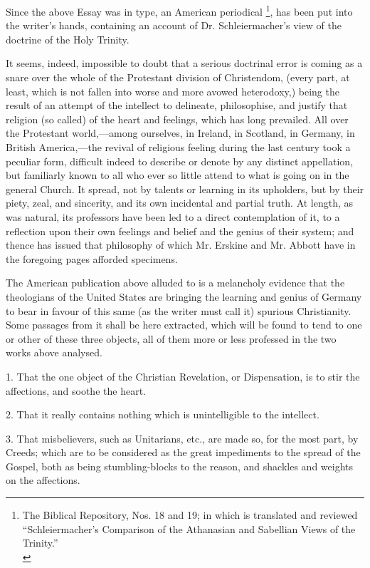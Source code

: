 Since the above Essay was in type, an American
periodical \footnote{The Biblical Repository, Nos. 18 and 19; in which is translated and
reviewed ``Schleiermacher's Comparison of the Athanasian and
Sabellian Views of the Trinity.''\textbf{}\\}, has been put
into the writer's hands, containing an account of Dr.
Schleiermacher's view of the doctrine of the Holy Trinity.

It seems, indeed, impossible to doubt that a
serious doctrinal error is coming as a snare over the whole of the
Protestant division of Christendom, (every part, at least, which is
not fallen into worse and more avowed heterodoxy,) being the result of
an attempt of the intellect to delineate, philosophise, and justify
that religion (so called) of the heart and feelings, which has long
prevailed. All over the Protestant world,—among ourselves, in
Ireland, in Scotland, in Germany, in British America,—the revival of
religious feeling during the last century took a peculiar form,
difficult indeed to describe or denote by any distinct appellation,
but familiarly known to all who ever so little attend to what is going
on in the general Church. It spread, not by talents or learning in its
upholders, but by their piety, zeal, and sincerity, and its own
incidental and partial truth. At length, as was natural, its
professors have been led to a direct contemplation of it, to a
reflection upon their own feelings and belief and the genius of their
system; and thence has issued that philosophy of which Mr.
Erskine and Mr. Abbott have in the foregoing pages afforded specimens.

The American publication above alluded to is a
melancholy evidence that the theologians of the United States are
bringing the learning and genius of Germany to bear in favour of this
same (as the writer must call it) spurious Christianity. Some passages
from it shall be here extracted, which will be found to tend to one or
other of these three objects, all of them more or less professed in
the two works above analysed.

1. That the one object of the Christian
Revelation, or Dispensation, is to stir the affections, and soothe the
heart.

2. That it really contains nothing which is
unintelligible to the intellect.

3. That misbelievers, such as Unitarians, etc.,
are made so, for the most part, by Creeds; which are to be considered
as the great impediments to the spread of the Gospel, both as being
stumbling-blocks to the reason, and shackles and weights on the
affections.

